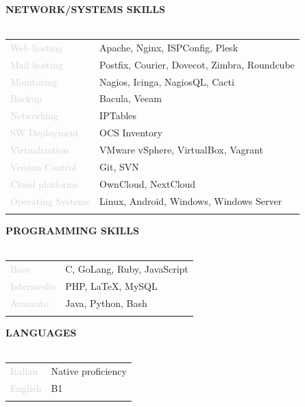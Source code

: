 \documentclass{article}
\begin{document}
\textbf{\textcolor{deepblue}{NETWORK/SYSTEMS SKILLS}} \\\\ \hfill
\begin{tabular}{ R{4cm} l }
	\textcolor{lightgray}{Web hosting}       & Apache, Nginx, ISPConfig, Plesk              \\ \hfill
	\textcolor{lightgray}{Mail hosting}      & Postfix, Courier, Dovecot, Zimbra, Roundcube \\ \hfill
	\textcolor{lightgray}{Monitoring}        & Nagios, Icinga, NagiosQL, Cacti              \\ \hfill
	\textcolor{lightgray}{Backup}            & Bacula, Veeam                                \\ \hfill
	\textcolor{lightgray}{Networking}        & IPTables                                     \\ \hfill
	\textcolor{lightgray}{SW Deployment}     & OCS Inventory                                \\ \hfill
	\textcolor{lightgray}{Virtualization}    & VMware vSphere, VirtualBox, Vagrant          \\ \hfill
	\textcolor{lightgray}{Version Control}   & Git, SVN                                     \\ \hfill
	\textcolor{lightgray}{Cloud platforms}   & OwnCloud, NextCloud                          \\ \hfill
	\textcolor{lightgray}{Operating Systems} & Linux, Android, Windows, Windows Server      \\ \hfill
\end{tabular}

\textbf{\textcolor{deepblue}{PROGRAMMING SKILLS}} \\\\ \hfill
\begin{tabular}{ R{4cm} l }
	\textcolor{lightgray}{Base}       & C, GoLang, Ruby, JavaScript \\ \hfill
	\textcolor{lightgray}{Intermedio} & PHP, LaTeX, MySQL           \\ \hfill
	\textcolor{lightgray}{Avanzato}   & Java, Python, Bash          \\ \hfill
\end{tabular}

\textbf{\textcolor{deepblue}{LANGUAGES}} \\\\ \hfill
\begin{tabular}{ R{4cm} l }
	\textcolor{lightgray}{Italian} & Native proficiency \\ \hfill
	\textcolor{lightgray}{English} & B1                 \\ \hfill
\end{tabular}
\end{document}
